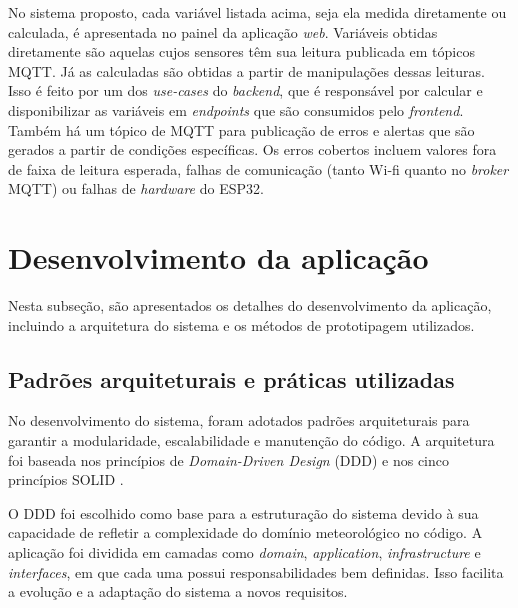 No sistema proposto, cada variável listada acima, seja ela medida diretamente ou calculada, é apresentada no painel da aplicação \textit{web}. Variáveis obtidas diretamente são aquelas cujos sensores têm sua leitura publicada em tópicos MQTT. Já as calculadas são obtidas a partir de manipulações dessas leituras. Isso é feito por um dos \textit{use-cases} do \textit{backend}, que é responsável por calcular e disponibilizar as variáveis em \textit{endpoints} que são consumidos pelo \textit{frontend}. Também há um tópico de MQTT para publicação de erros e alertas que são gerados a partir de condições específicas. Os erros cobertos incluem valores fora de faixa de leitura esperada, falhas de comunicação (tanto Wi-fi quanto no \textit{broker} MQTT) ou falhas de \textit{hardware} do ESP32.

\section{Desenvolvimento da aplicação}
Nesta subseção, são apresentados os detalhes do desenvolvimento da aplicação, incluindo a arquitetura do sistema e os métodos de prototipagem utilizados.

\subsection{Padrões arquiteturais e práticas utilizadas}

No desenvolvimento do sistema, foram adotados padrões arquiteturais para garantir a modularidade, escalabilidade e manutenção do código. A arquitetura foi baseada nos princípios de \textit{Domain-Driven Design} (DDD) e nos cinco princípios SOLID \parencite{ddd_eric2004}.

O DDD foi escolhido como base para a estruturação do sistema devido à sua capacidade de refletir a complexidade do domínio meteorológico no código. A aplicação foi dividida em camadas como \textit{domain}, \textit{application}, \textit{infrastructure} e \textit{interfaces}, em que cada uma possui responsabilidades bem definidas. Isso facilita a evolução e a adaptação do sistema a novos requisitos.


